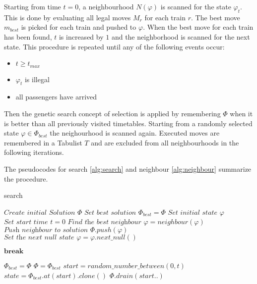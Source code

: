 \documentclass[a4paper,10pt,parskip]{article}
\begin{document}
Starting from time $t=0$, a neighbourhood $N(\varphi)$ is scanned for the state 
$\varphi_t$. This is done by evaluating all legal moves $M_r$ for each train $r$. 
The best move $m_{best}$ is picked for each train and pushed to $\varphi$. When 
the best move for each train has been found, $t$ is increased by $1$ and the 
neighborhood is scanned for the next state. This procedure is repeated until any 
of the following events occur:

\begin{itemize}
    \item $t \ge t_{max}$
    \item $\varphi_t$ is illegal
    \item all passengers have arrived
\end{itemize}

Then the genetic search concept of selection is applied by remembering $\Phi$ 
when it is better than all previously visited timetables. Starting from a 
randomly selected state $\varphi \in \Phi_{best}$ the neighourhood is scanned 
again. Executed moves are remembered in a Tabulist $T$ and are excluded from all 
neighbourhoods in the following iterations.

The pseudocodes for search \ref{alg:search} and neighbour \ref{alg:neighbour}
summarize the procedure.

\begin{algorithm}
\caption{search}\label{alg:search}
\begin{algorithmic}
    \State $\textit{Create initial Solution } \Phi$
    \State $\textit{Set best solution } \Phi_{best} = \Phi$
    \State $\textit{Set initial state } \varphi$
    \State $\textit{Set start time } t=0$
            \State $\textit{Find the best neighbour } \varphi = neighbour(\varphi)$
            \State $\textit{Push neighbour to solution } \Phi.push(\varphi)$
            \State $\textit{Set the next null state } \varphi = \varphi.next\_null()$

                \State $\textbf{break}$
            \EndIf
        \EndWhile

            \State $\Phi_{best} = \Phi$
        \Else
            \State $\Phi = \Phi_{best}$
        \EndIf  
        \State $start = random\_number\_between(0, t)$
        \State $state = \Phi_{best}.at(start).clone()$
        \State $\Phi.drain(start..)$
    \EndWhile
\end{algorithmic}
\end{algorithm}
\end{document}
